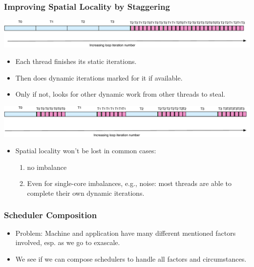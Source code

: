 \begin{frame}[label=sdsSched]
\frametitle{Improving Spatial Locality by Staggering}
\begin{center}
\includegraphics[scale=0.28]{./images/sdIncrIters}
\end{center}
\begin{itemize}
\small \item \small Each thread finishes its static iterations.
\item \small Then does dynamic iterations marked for it if available.
\item \small Only if not, looks for other dynamic work from other threads to steal.
\end{itemize}
\begin{center}
\includegraphics[scale=0.28]{./images/sdsIncrIters}
\end{center}
\begin{itemize}
\item \small Spatial locality won't be lost in common cases:
\begin{enumerate}
\tiny \item \tiny no imbalance
\item \tiny Even for single-core imbalances, e.g., noise: most
 threads are able to complete their own dynamic iterations.
\end{enumerate}
\end{itemize}
\end{frame}

\begin{frame}[label=schedComp]
\frametitle{Scheduler Composition}
\begin{itemize}
\small \item \small Problem: Machine and application have many
different mentioned factors involved, esp. as we go to exascale.
\item \small We see if we can compose schedulers to handle all factors and circumstances.
\end{itemize}
\end{frame}

